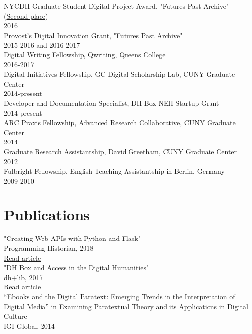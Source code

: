 \documentclass[11pt]{article}
\begin{document}
NYCDH Graduate Student Digital Project Award, "Futures Past Archive" (\href{http://nycdh.org/nycdh-graduate-student-digital-project-awards-2016/}{Second place})\\
2016\\

Provost's Digital Innovation Grant, "Futures Past Archive"\\
2015-2016 and 2016-2017\\

Digital Writing Fellowship, Qwriting, Queens College\\
2016-2017\\

Digital Initiatives Fellowship, GC Digital Scholarship Lab, CUNY Graduate Center\\
2014-present\\

Developer and Documentation Specialist, DH Box NEH Startup Grant\\
2014-present\\

ARC Praxis Fellowship, Advanced Research Collaborative, CUNY Graduate Center\\
2014\\

Graduate Research Assistantship, David Greetham, CUNY Graduate Center\\
2012\\

Fulbright Fellowship, English Teaching Assistantship in Berlin, Germany\\
2009-2010\\

\section*{Publications}
\label{sec:orgheadline3}
"Creating Web APIs with Python and Flask"\\
Programming Historian, 2018\\
\href{https://programminghistorian.org/lessons/creating-apis-with-python-and-flask}{Read article}\\


"DH Box and Access in the Digital Humanities"\\
dh+lib, 2017\\
\href{http://acrl.ala.org/dh/2017/06/21/dh-box-and-access-in-the-digital-humanities/}{Read article}\\

“Ebooks and the Digital Paratext: Emerging Trends in the Interpretation of Digital Media” in Examining Paratextual Theory and its Applications in Digital Culture\\
IGI Global, 2014\\
\end{document}
